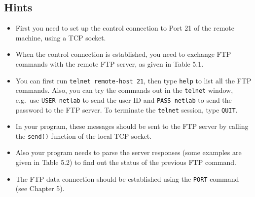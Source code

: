 \documentclass{../UTNetLab}
\begin{document}
    \subsection*{Hints}
    \begin{itemize}
        \item First you need to set up the control connection to Port 21 of the remote machine, using a TCP socket.
        \item When the control connection is established, you need to exchange FTP commands with the remote FTP server, as given in Table 5.1.
        \item You can first run \lstinline{telnet remote-host 21}, then type \lstinline{help} to list all the FTP commands.
        Also, you can try the commands out in the \lstinline{telnet} window, e.g.\ use \lstinline{USER netlab} to send the user ID and \lstinline{PASS netlab} to send the password to the FTP server.
        To terminate the \lstinline{telnet} session, type \lstinline{QUIT}.
        \item In your program, these messages should be sent to the FTP server by calling the \lstinline{send()} function of the local TCP socket.
        \item Also your program needs to parse the server responses (some examples are given in Table 5.2) to find out the status of the previous FTP command.
        \item The FTP data connection should be established using the \lstinline{PORT} command (see Chapter 5).
    \end{itemize}
\end{document}

